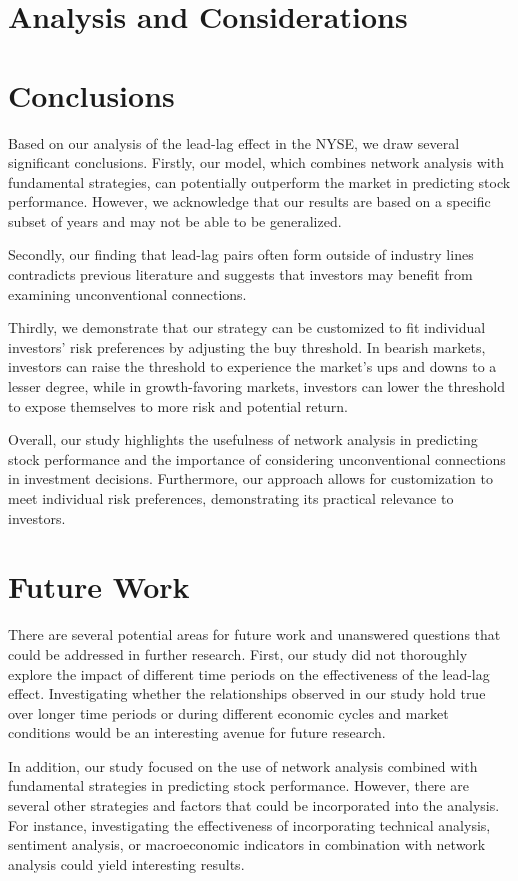 \documentclass{article}
\begin{document}
\section{Analysis and Considerations}
\section{Conclusions}
Based on our analysis of the lead-lag effect in the NYSE, we draw several significant conclusions. Firstly, our model, which combines network analysis with fundamental strategies, can potentially outperform the market in predicting stock performance. However, we acknowledge that our results are based on a specific subset of years and may not be able to be generalized. 

Secondly, our finding that lead-lag pairs often form outside of industry lines contradicts previous literature and suggests that investors may benefit from examining unconventional connections. 

Thirdly, we demonstrate that our strategy can be customized to fit individual investors' risk preferences by adjusting the buy threshold. In bearish markets, investors can raise the threshold to experience the market's ups and downs to a lesser degree, while in growth-favoring markets, investors can lower the threshold to expose themselves to more risk and potential return. 

Overall, our study highlights the usefulness of network analysis in predicting stock performance and the importance of considering unconventional connections in investment decisions. Furthermore, our approach allows for customization to meet individual risk preferences, demonstrating its practical relevance to investors.

\section{Future Work}

There are several potential areas for future work and unanswered questions that could be addressed in further research. First, our study did not thoroughly explore the impact of different time periods on the effectiveness of the lead-lag effect. Investigating whether the relationships observed in our study hold true over longer time periods or during different economic cycles and market conditions would be an interesting avenue for future research.

In addition, our study focused on the use of network analysis combined with fundamental strategies in predicting stock performance. However, there are several other strategies and factors that could be incorporated into the analysis. For instance, investigating the effectiveness of incorporating technical analysis, sentiment analysis, or macroeconomic indicators in combination with network analysis could yield interesting results. 
\end{document}
